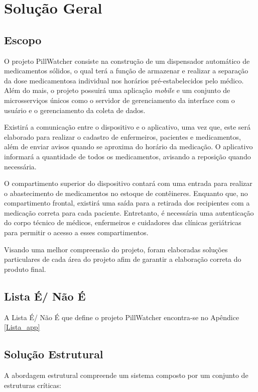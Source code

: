 \chapter[Solução Geral]{Solução Geral}
\section{Escopo}
O projeto PillWatcher consiste na construção de um dispensador automático de medicamentos sólidos, o qual terá a função de armazenar e realizar a separação da dose medicamentosa individual nos horários pré-estabelecidos pelo médico. Além do mais, o projeto possuirá uma aplicação \textit{mobile} e um conjunto de microsserviços únicos como o servidor de gerenciamento da interface com o usuário e o gerenciamento da coleta de dados.

Existirá a comunicação entre o dispositivo e o aplicativo, uma vez que, este será elaborado para realizar o cadastro de enfermeiros, pacientes e medicamentos, além de enviar avisos quando se aproxima do horário da medicação. O aplicativo informará a quantidade de todos os medicamentos, avisando a reposição quando necessária.

O compartimento superior do dispositivo contará com uma entrada para realizar o abastecimento de medicamentos no estoque de contêineres. Enquanto que, no compartimento frontal, existirá uma saída para a retirada dos recipientes com a medicação correta para cada paciente. Entretanto, é necessária uma autenticação do corpo técnico de médicos, enfermeiros e cuidadores das clínicas geriátricas para permitir o acesso a esses compartimentos.

Visando uma melhor compreensão do projeto, foram elaboradas soluções particulares de cada área do projeto afim de garantir a elaboração correta do produto final.

\section{Lista É/ Não É}
A Lista É/ Não É que define o projeto PillWatcher encontra-se no Apêndice \ref{Lista_app}
\section{Solução Estrutural}
A abordagem estrutural compreende um sistema composto por um conjunto de estruturas críticas:

